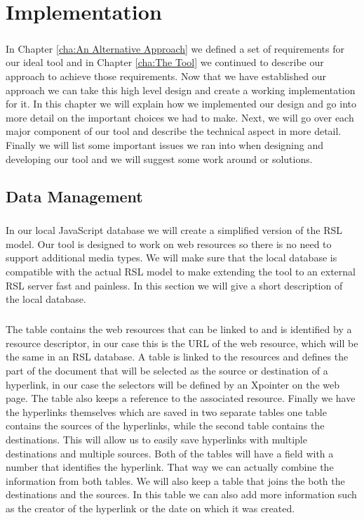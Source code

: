 
\chapter{Implementation} \label{cha:Implementation}
	\paragraph{}
	In Chapter \ref{cha:An Alternative Approach} we defined a set of requirements for our ideal tool and in Chapter \ref{cha:The Tool} we continued to describe our approach to achieve those requirements. Now that we have established our approach we can take this high level design and create a working implementation for it. In this chapter we will explain how we implemented our design and go into more detail on the important choices we had to make. Next, we will go over each major component of our tool and describe the technical aspect in more detail. Finally we will list some important issues we ran into when designing and developing our tool and we will suggest some work around or solutions.
	\section{Data Management} \label{sec:Data Management}
	\paragraph{}
	In our local JavaScript database we will create a simplified version of the RSL~\cite{SignerDOC}~\cite{Signer2007} model. Our tool is designed to work on web resources so there is no need to support additional media types. We will make sure that the local database is compatible with the actual RSL model to make extending the tool to an external RSL server fast and painless. In this section we will give a short description of the local database.
	\paragraph{}
	The  table contains the web resources that can be linked to and is identified by a resource descriptor, in our case this is the URL of the web resource, which will be the same in an RSL database. A  table is linked to the resources and defines the part of the document that will be selected as the source or destination of a hyperlink, in our case the selectors will be defined by an Xpointer on the web page. The  table also keeps a reference to the associated resource. Finally we have the hyperlinks themselves which are saved in two separate tables one table contains the sources of the hyperlinks, while the second table contains the destinations. This will allow us to easily save hyperlinks with multiple destinations and multiple sources. Both of the tables will have a field with a number that identifies the hyperlink. That way we can actually combine the information from both tables. We will also keep a  table that joins the both the destinations and the sources. In this table we can also add more information such as the creator of the hyperlink or the date on which it was created.
